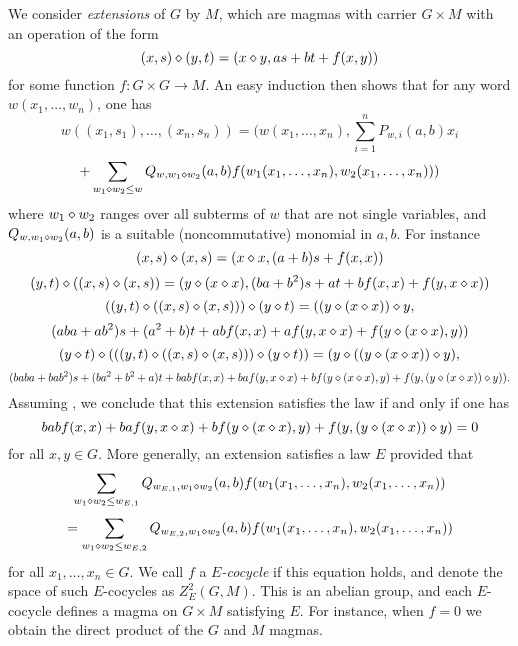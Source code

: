 We consider \emph{extensions} of $G$ by $M$, which are magmas with carrier $G \times M$ with an operation of the form
\begin{equation}\label{extension}
  (x,s) \diamond (y,t) = (x \diamond y, as + bt + f(x,y))
\end{equation}
for some function $f: G \times G \to M$.  An easy induction then shows that for any word $w(x_1,\dots,w_n)$, one has
$$ w((x_1,s_1),\dots,(x_n,s_n)) = (w(x_1,\dots,x_n), \sum_{i=1}^n P_{w,i}(a,b) x_i$$
$$ + \sum_{w_1 \diamond w_2 \leq w} Q_{w,w_1 \diamond w_2}(a,b) f(w_1(x_1,\dots,x_n), w_2(x_1,\dots,x_n)))$$
where $w_1 \diamond w_2$ ranges over all subterms of $w$ that are not single variables, and $Q_{w,w_1 \diamond w_2}(a,b)$ is a suitable (noncommutative) monomial in $a,b$.  For instance
$$ (x,s) \diamond (x,s) = (x \diamond x, (a+b) s + f(x,x))$$
$$ (y,t) \diamond ((x,s) \diamond (x,s)) = (y \diamond (x \diamond x), (ba+b^2) s + at + b f(x,x) + f(y, x \diamond x))$$
$$ ((y,t) \diamond ((x,s) \diamond (x,s))) \diamond (y \diamond t) = ((y \diamond (x \diamond x)) \diamond y,$$
$$ (aba+ab^2) s + (a^2+b)t + ab f(x,x) + a f(y, x \diamond x) + f(y \diamond (x \diamond x), y))$$
$$ (y \diamond t) \diamond (((y,t) \diamond ((x,s) \diamond (x,s))) \diamond (y \diamond t)) = (y \diamond ((y \diamond (x \diamond x)) \diamond y), $$
$$(baba+bab^2) s + (ba^2+b^2+a)t + bab f(x,x) + ba f(y, x \diamond x) + bf(y \diamond (x \diamond x), y) + f( y, (y \diamond (x \diamond x)) \diamond y)).$$
Assuming , we conclude that this extension satisfies the law  if and only if one has
\begin{equation}\label{cocycle-1110}
  bab f(x,x) + ba f(y, x \diamond x) + bf(y \diamond (x \diamond x), y) + f( y, (y \diamond (x \diamond x)) \diamond y) = 0
\end{equation}
for all $x,y \in G$.  More generally, an extension satisfies a law $E$ provided that
$$ \sum_{w_1 \diamond w_2 \leq w_{E,1}} Q_{w_{E,1},w_1 \diamond w_2}(a,b) f(w_1(x_1,\dots,x_n), w_2(x_1,\dots,x_n))$$
$$= \sum_{w_1 \diamond w_2 \leq w_{E,2}} Q_{w_{E,2},w_1 \diamond w_2}(a,b) f(w_1(x_1,\dots,x_n), w_2(x_1,\dots,x_n))$$
for all $x_1,\dots,x_n \in G$.  We call $f$ a \emph{$E$-cocycle} if this equation holds, and denote the space of such $E$-cocycles as $Z^2_E(G,M)$.  This is an abelian group, and each $E$-cocycle defines a magma on $G \times M$ satisfying $E$.  For instance, when $f=0$ we obtain the direct product of the $G$ and $M$ magmas.

